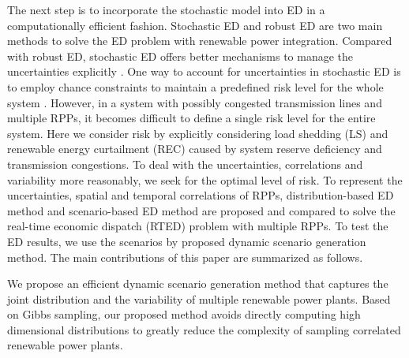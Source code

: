 The next step is to incorporate the stochastic model into ED in a computationally efficient fashion. Stochastic ED \cite{chance_constrain}\cite{ST_ED} and robust ED \cite{Robust_1}\cite{Robust_2} are two main methods to solve the ED problem with renewable power integration. Compared with robust ED, stochastic ED offers better mechanisms to manage the uncertainties explicitly \cite{ST_ED}. One way to account for uncertainties in stochastic ED is to employ chance constraints to maintain a predefined risk level for the whole system \cite{chance_constrain}\cite{ST_ED}. However, in a system with possibly congested transmission lines and multiple RPPs, it becomes difficult to define a single risk level for the entire system. Here we consider risk by explicitly considering load shedding (LS) and renewable energy curtailment (REC) caused by system reserve deficiency and transmission congestions. To deal with the uncertainties, correlations and variability more reasonably, we seek for the optimal level of risk. To represent the uncertainties, spatial and temporal correlations of RPPs, distribution-based ED method and scenario-based ED method are proposed and compared to solve the real-time economic dispatch (RTED) problem with multiple RPPs. To test the ED results, we use the scenarios by proposed dynamic scenario generation method. The main contributions of this paper are summarized as follows.




We propose an efficient dynamic scenario generation method that captures the joint distribution and the variability
of multiple renewable power plants. Based on Gibbs sampling, our proposed method avoids directly computing high dimensional distributions to greatly reduce the complexity of sampling correlated renewable power plants.

